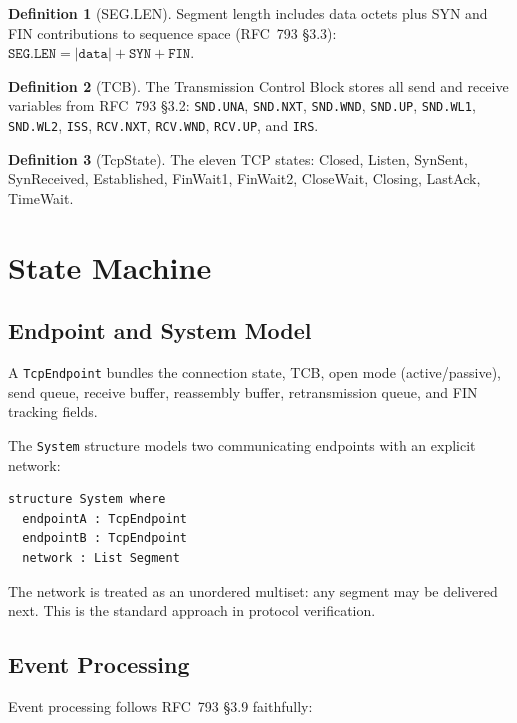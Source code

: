 \documentclass[11pt]{article}
\theoremstyle{definition}
\newtheorem{definition}{Definition}[section]
\begin{document}
\begin{definition}[SEG.LEN]
Segment length includes data octets plus SYN and FIN contributions to sequence
space (RFC~793 \S3.3): $\texttt{SEG.LEN} = |\texttt{data}| + \texttt{SYN} +
\texttt{FIN}$.
\end{definition}

\begin{definition}[TCB]
The Transmission Control Block stores all send and receive variables from
RFC~793 \S3.2: \texttt{SND.UNA}, \texttt{SND.NXT}, \texttt{SND.WND},
\texttt{SND.UP}, \texttt{SND.WL1}, \texttt{SND.WL2}, \texttt{ISS},
\texttt{RCV.NXT}, \texttt{RCV.WND}, \texttt{RCV.UP}, and \texttt{IRS}.
\end{definition}

\begin{definition}[TcpState]
The eleven TCP states: Closed, Listen, SynSent, SynReceived, Established,
FinWait1, FinWait2, CloseWait, Closing, LastAck, TimeWait.
\end{definition}

\section{State Machine}
\label{sec:state}

\subsection{Endpoint and System Model}

A \texttt{TcpEndpoint} bundles the connection state, TCB, open mode
(active/passive), send queue, receive buffer, reassembly buffer,
retransmission queue, and FIN tracking fields.

The \texttt{System} structure models two communicating endpoints with an
explicit network:
\begin{lstlisting}
structure System where
  endpointA : TcpEndpoint
  endpointB : TcpEndpoint
  network : List Segment
\end{lstlisting}

The network is treated as an unordered multiset: any segment may be delivered
next. This is the standard approach in protocol verification.

\subsection{Event Processing}

Event processing follows RFC~793 \S3.9 faithfully:
\end{document}

